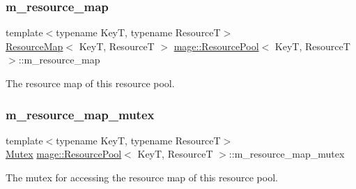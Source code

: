 \subsubsection{\texorpdfstring{m\+\_\+resource\+\_\+map}{m\_resource\_map}}
{\footnotesize\ttfamily template$<$typename KeyT, typename ResourceT$>$ \\
\hyperlink{namespacemage_a3aaea9153b9e896914d7a1155d8c7bbe}{Resource\+Map}$<$ KeyT, ResourceT $>$ \hyperlink{classmage_1_1_resource_pool}{mage\+::\+Resource\+Pool}$<$ KeyT, ResourceT $>$\+::m\+\_\+resource\+\_\+map\hspace{0.3cm}{\ttfamily [private]}}

The resource map of this resource pool. \hypertarget{classmage_1_1_resource_pool_a5857b70ac755db750dcaff5277201f9f}{}\label{classmage_1_1_resource_pool_a5857b70ac755db750dcaff5277201f9f} 
\subsubsection{\texorpdfstring{m\+\_\+resource\+\_\+map\+\_\+mutex}{m\_resource\_map\_mutex}}
{\footnotesize\ttfamily template$<$typename KeyT, typename ResourceT$>$ \\
\hyperlink{structmage_1_1_mutex}{Mutex} \hyperlink{classmage_1_1_resource_pool}{mage\+::\+Resource\+Pool}$<$ KeyT, ResourceT $>$\+::m\+\_\+resource\+\_\+map\+\_\+mutex\hspace{0.3cm}{\ttfamily [private]}}

The mutex for accessing the resource map of this resource pool. 